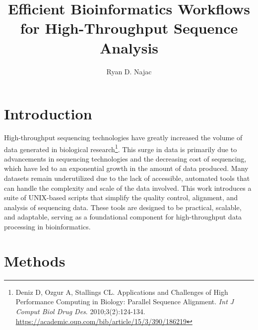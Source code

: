 \documentclass[unnumsec,webpdf,contemporary,large]{oup-authoring-template}
\theoremstyle{thmstyleone}%
\theoremstyle{thmstyletwo}%
\theoremstyle{thmstylethree}%
\begin{document}

\title[Combinatorial Bioinformatics Meta-Framework]{Efficient Bioinformatics Workflows for High-Throughput Sequence Analysis}

\author[1,$\ast$]{Ryan D. Najac}



\section{Introduction}
High-throughput sequencing technologies have greatly increased the volume of data generated in biological research\footnote{Deniz D, Ozgur A, Stallings CL. Applications and Challenges of High Performance Computing in Biology: Parallel Sequence Alignment. \textit{Int J Comput Biol Drug Des}. 2010;3(2):124-134. \url{https://academic.oup.com/bib/article/15/3/390/186219}}. This surge in data is primarily due to advancements in sequencing technologies and the decreasing cost of sequencing, which have led to an exponential growth in the amount of data produced. Many datasets remain underutilized due to the lack of accessible, automated tools that can handle the complexity and scale of the data involved. This work introduces a suite of UNIX-based scripts that simplify the quality control, alignment, and analysis of sequencing data. These tools are designed to be practical, scalable, and adaptable, serving as a foundational component for high-throughput data processing in bioinformatics.

\section{Methods}
\end{document}
